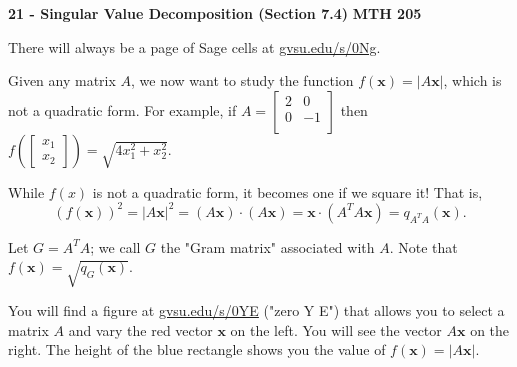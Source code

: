 \documentclass[12pt]{article}
\newcommand{\xvec}{{\mathbf x}}
\newcommand{\twovec}[2]{\left[\begin{array}{r}#1 \\ #2
    \end{array}\right]}
\newcommand{\mattwo}[4]{\left[\begin{array}{rr}#1 & #2 \\ #3 & #4 \\ \end{array}\right]}
\begin{document}
\noindent
{\bf 21 - Singular Value Decomposition (Section 7.4)} \hfill {\bf MTH 205} 

\bigskip

\noindent There will always be a page of Sage cells at \url{gvsu.edu/s/0Ng}.

\bigskip

Given any matrix $A$, we now want to study the function $f(\xvec) = |A\xvec|$, which is not a
quadratic form. For example, if $A=\mattwo{2}{0}{0}{-1}$ then $f\left(\twovec{x_1}{x_2}\right)=\sqrt{4x_1^2+x_2^2}$. 

While $f(x)$ is not a quadratic form, it becomes one if we square it!  That is, 
$$(f(\xvec))^2 = |A\xvec|^2 = (A\xvec)\cdot (A\xvec) = \xvec \cdot (A^TA\xvec) = q_{A^TA}(\xvec).$$

\noindent Let $G = A^TA$; we call $G$ the "Gram matrix" associated with $A$.  Note that $f(\xvec) = \sqrt{q_G(\xvec)}$.
\bigskip

You will find a figure at \url{gvsu.edu/s/0YE} ("zero Y E") that allows you to select a matrix
$A$ and vary the red vector $\xvec$ on the left. You will see the vector $A\xvec$ on the right. The height
of the blue rectangle shows you the value of $f(\xvec) = |A\xvec|$.
\end{document}
